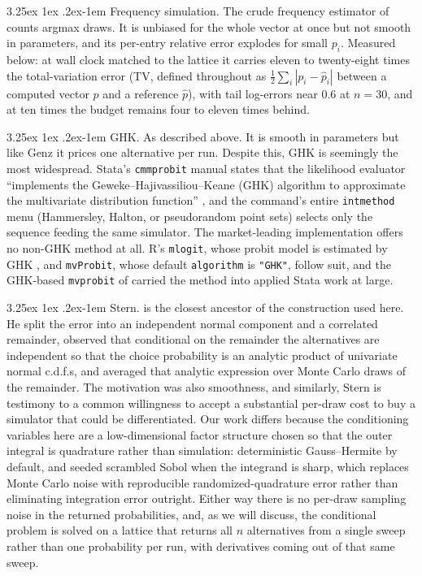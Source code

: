 \documentclass[11pt]{article}
\makeatletter
\renewcommand\paragraph{\@startsection{paragraph}{4}{\z@}%
  {3.25ex \@plus1ex \@minus.2ex}{-1em}%
  {\normalfont\normalsize\itshape}}
\makeatother
\begin{document}
\paragraph{Frequency simulation.} The crude frequency estimator of
\citet{lerman1981} counts argmax draws. It is unbiased for the whole vector at
once but not smooth in parameters, and its per-entry relative error explodes for
small $p_i$. Measured below: at wall clock matched to the lattice it carries
eleven to twenty-eight times the total-variation error (TV, defined throughout as $\tfrac12\sum_i|p_i-\hat p_i|$ between a computed vector $p$ and a reference $\hat p$), with tail
log-errors near $0.6$ at $n=30$, and at ten times the budget remains four
to eleven times behind.

\paragraph{GHK.} As described above. It is smooth in parameters but like Genz it prices one alternative per run. Despite this, GHK is seemingly the most widespread. Stata's \texttt{cmmprobit} manual states that the likelihood evaluator ``implements the Geweke--Hajivassiliou--Keane (GHK) algorithm to approximate the multivariate distribution function''
\citep{statacorp2023,gates2006}, and the command's entire
\texttt{intmethod} menu (Hammersley, Halton, or pseudorandom point
sets) selects only the sequence feeding the same simulator. The
market-leading implementation offers no non-GHK method at all. R's
\texttt{mlogit}, whose probit model is estimated by GHK
\citep{croissant2020}, and \texttt{mvProbit}, whose default
\texttt{algorithm} is \texttt{"GHK"}, follow suit, and the GHK-based \texttt{mvprobit} of
\citet{cappellari2003} carried the method into applied Stata work at
large.

\paragraph{Stern.}
\citet{stern1992} is the closest ancestor of the construction used here.
He split the error into an independent normal component and a correlated
remainder, observed that conditional on the remainder the alternatives
are independent so that the choice probability is an analytic product of
univariate normal c.d.f.s, and averaged that analytic expression over
Monte Carlo draws of the remainder. The motivation was also smoothness, and
similarly, Stern is testimony to a common willingness to accept a substantial per-draw cost to buy a simulator that could be differentiated. Our work differs because the conditioning variables here are a
low-dimensional factor structure chosen so that the outer integral is
quadrature rather than simulation: deterministic Gauss--Hermite by
default, and seeded scrambled Sobol when the integrand is sharp, which
replaces Monte Carlo noise with reproducible randomized-quadrature error
rather than eliminating integration error outright. Either way there is
no per-draw sampling noise in the returned probabilities, and, as we will discuss, the conditional problem is solved on a lattice that returns all $n$ alternatives from a single sweep rather than one probability per run, with derivatives coming out of that same
sweep.
\end{document}
